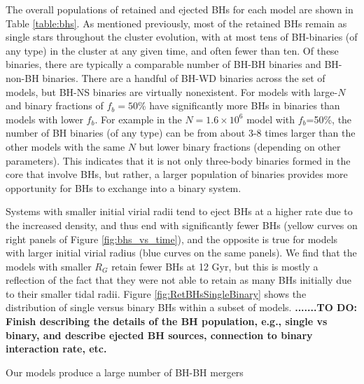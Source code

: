 \documentclass[12pt,preprint]{aastex}
\begin{document}
The overall populations of retained and ejected BHs for each model are shown in 
Table \ref{table:bhs}. As mentioned previously, most of the retained BHs
remain as single stars throughout the cluster evolution, with at most
tens of BH-binaries (of any type) in the cluster at any given time, and often fewer than ten. Of these binaries, 
there are typically a comparable number of BH-BH binaries and BH-non-BH binaries.
There are a handful of BH-WD binaries across the set of models, but BH-NS
binaries are virtually nonexistent. For models with 
large-$N$ and binary fractions of $f_b=50$\% 
have significantly more BHs in binaries than models with lower $f_b$. For example
in the $N= 1.6 \times 10^6$ model with $f_b$=50\%, the number of BH binaries (of any type)
can be from about 3-8 times larger than the other models with the same $N$ but 
lower binary fractions (depending on other parameters). This indicates that it is not 
only three-body binaries formed in the 
core that involve BHs, but rather, a larger population of binaries provides more 
opportunity for BHs to exchange into a binary system.

Systems with smaller initial virial radii tend to eject BHs at a higher rate due to
the increased density, and thus end with significantly fewer
BHs (yellow curves on right panels of Figure \ref{fig:bhs_vs_time}), and the opposite is true for 
models with larger initial virial radius (blue curves on the same panels). We find that the models 
with smaller $R_G$ retain fewer BHs
at 12 Gyr, but this is mostly a reflection of the fact that they were not able to retain as many BHs
initially due to their smaller tidal radii. Figure \ref{fig:RetBHsSingleBinary}
shows the distribution of single versus binary BHs within a subset of models. 
\textbf{.......TO DO:  Finish describing the details of the BH population, e.g., single vs binary, and
describe ejected BH sources, connection to binary interaction rate, etc.}

Our models produce a large number of BH-BH mergers




\end{document}
